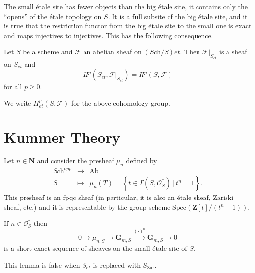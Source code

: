 \noindent
The small \'etale site has fewer objects than the big \'etale site, it contains
only the ``opens'' of the \'etale topology on $S$. It is a full subsite of the
big \'etale site, and it is true that the restriction functor from the big
\'etale site to the small one is exact and maps injectives to injectives. This
has the following consequence.

\begin{proposition}
\label{proposition-cohomology-restrict-small-site}
Let $S$ be a scheme and $\mathcal{F}$ an abelian sheaf on $(\textit{Sch}/S)et$.
Then $\mathcal{F}|_{S_{et}}$ is a sheaf on $S_{et}$ and
$$
H^p(S_{et}, \mathcal{F}|_{S_{et}}) = H^p(S, \mathcal{F})
$$
for all $p \geq 0$.
\end{proposition}

\noindent
We write $H_{et}^p(S,\mathcal{F})$ for the above cohomology group.





\section{Kummer Theory}
\label{section-kummer}

\noindent
Let $n \in \mathbf{N}$ and consider the presheaf $\mu_n$ defined by
$$
\begin{matrix}
\textit{Sch}^{opp} & \longrightarrow & \text{Ab} \\
S & \longmapsto & \mu_n(T) = \left\{t \in \Gamma(S, \mathcal{O}_S^*) \ | \
t^n = 1 \right\}.
\end{matrix}
$$
This presheaf is an fpqc sheaf (in particular, it is also an \'etale sheaf,
Zariski sheaf, etc.) and it is representable by the group scheme $\text{Spec}
(\mathbf{Z}[t]/(t^n-1))$.

\begin{lemma}
\label{lemma-kummer-sequence}
If $n\in \mathcal{O}_S^*$ then
$$
0\to \mu_{n, S} \to \mathbf{G}_{m, S} \xrightarrow{(\cdot)^n} \mathbf{G}_{m,
S}\to 0
$$
is a short exact sequence of sheaves on the small \'etale site of $S$.
\end{lemma}

\begin{remark}
\label{remark-no-kummer-sequence-zariski}
This lemma is false when $S_{et}$ is replaced with $S_\mathrm{Zar}$.
\end{remark}

